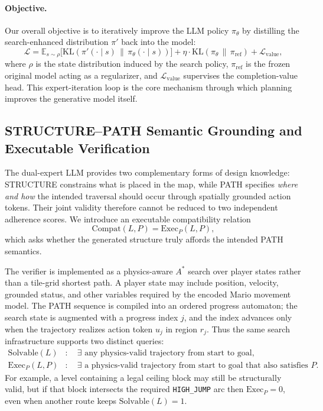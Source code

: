 \documentclass[11pt,a4paper]{article}
\begin{document}
\paragraph{Objective.}
Our overall objective is to iteratively improve the LLM policy \(\pi_\theta\) by distilling the search-enhanced distribution \(\pi'\) back into the model:
\begin{equation}
    \mathcal{L} = \mathbb{E}_{s \sim \rho}\bigl[ \mathrm{KL}(\pi'(\cdot \mid s) \,\|\, \pi_\theta(\cdot \mid s)) \bigr] + \eta \cdot \mathrm{KL}(\pi_\theta \,\|\, \pi_{\mathrm{ref}}) + \mathcal{L}_{\mathrm{value}},
    \label{eq:distillation_loss}
\end{equation}
where \(\rho\) is the state distribution induced by the search policy, \(\pi_{\mathrm{ref}}\) is the frozen original model acting as a regularizer, and \(\mathcal{L}_{\mathrm{value}}\) supervises the completion-value head. This expert-iteration loop is the core mechanism through which planning improves the generative model itself.


\subsection{STRUCTURE--PATH Semantic Grounding and Executable Verification}
\label{sec:semantic_grounding}
The dual-expert LLM provides two complementary forms of design knowledge: STRUCTURE constrains what is placed in the map, while PATH specifies \emph{where and how} the intended traversal should occur through spatially grounded action tokens. Their joint validity therefore cannot be reduced to two independent adherence scores. We introduce an executable compatibility relation
\begin{equation}
    \mathrm{Compat}(L,P)=\mathrm{Exec}_{P}(L,P),
\end{equation}
which asks whether the generated structure truly affords the intended PATH semantics.

The verifier is implemented as a physics-aware \(A^*\) search over player states rather than a tile-grid shortest path. A player state may include position, velocity, grounded status, and other variables required by the encoded Mario movement model. The PATH sequence is compiled into an ordered progress automaton; the search state is augmented with a progress index \(j\), and the index advances only when the trajectory realizes action token \(u_j\) in region \(r_j\). Thus the same search infrastructure supports two distinct queries:
\begin{align}
    \mathrm{Solvable}(L) &:\quad \exists\text{ any physics-valid trajectory from start to goal},\\
    \mathrm{Exec}_{P}(L,P) &:\quad \exists\text{ a physics-valid trajectory from start to goal that also satisfies }P.
\end{align}
For example, a level containing a legal ceiling block may still be structurally valid, but if that block intersects the required \texttt{HIGH\_JUMP} arc then \(\mathrm{Exec}_{P}=0\), even when another route keeps \(\mathrm{Solvable}(L)=1\).
\end{document}
